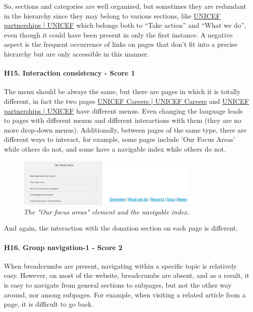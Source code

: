 \newline
So, sections and categories are well organized, but sometimes they are redundant in the hierarchy since they may belong to various sections, like \href{https://www.unicef.org/partnerships}{UNICEF partnerships | UNICEF} which belongs both to “Take action” and “What we do”, even though it could have been present in only the first instance. 
\newline A negative aspect is the frequent occurrence of links on pages that don't fit into a precise hierarchy but are only accessible in this manner.
\newline
\newline \paragraph{H15. Interaction consistency - Score 1}	\label{subsec:H15}The menu should be always the same, but there are pages in which it is totally different, in fact the two pages \href{https://www.unicef.org/careers/}{UNICEF Careers | UNICEF Careers} and \href{https://www.unicef.org/partnerships}{UNICEF partnerships | UNICEF} have different menus. Even changing the language leads to pages with different menus and different interactions with them (they are no more drop-down menus).
\newline Additionally, between pages of the same type, there are different ways to interact, for example, some pages include 'Our Focus Areas' while others do not, and some have a navigable index while others do not.
\begin{figure}[!h]
	\begin{center}
		\includegraphics[width=0.8\textwidth]{FinalScores19.jpg}
		\captionsetup{font=small}
		\caption{\textit{The "Our focus areas" element and the navigable index.}}
	\end{center}
\end{figure}
\newline And again, the interaction with the donation section on each page is different.
\newline
\newline \paragraph{H16. Group navigation-1 - Score 2}  \label{subsec:H16}	When breadcrumbs are present, navigating within a specific topic is relatively easy. However, on most of the website, breadcrumbs are absent, and as a result, it is easy to navigate from general sections to subpages, but not the other way around, nor among subpages. For example, when visiting a related article from a page, it is difficult to go back.
